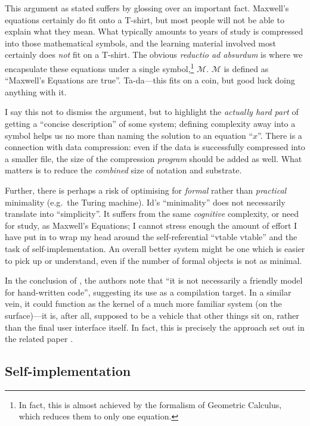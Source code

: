 This argument as stated suffers by glossing over an important fact.
Maxwell's equations certainly do fit onto a T-shirt, but most people
will not be able to explain what they mean. What typically amounts to
years of study is compressed into those mathematical symbols, and the
learning material involved most certainly does \emph{not} fit on a
T-shirt. The obvious \emph{reductio ad absurdum} is where we encapsulate
these equations under a single symbol,\footnote{In fact, this is almost
  achieved by the formalism of Geometric Calculus, which reduces them to
  only one equation.} \(\mathcal{M}\). \(\mathcal{M}\) is defined as
``Maxwell's Equations are true''. Ta-da---this fits on a coin, but good
luck doing anything with it.

I say this not to dismiss the argument, but to highlight the
\emph{actually hard part} of getting a ``concise description'' of some
system; defining complexity away into a symbol helps us no more than
naming the solution to an equation ``\(x\)''. There is a connection with
data compression: even if the data is successfully compressed into a
smaller file, the size of the compression \emph{program} should be added
as well. What matters is to reduce the \emph{combined} size of notation
and substrate.

Further, there is perhaps a risk of optimising for \emph{formal} rather
than \emph{practical} minimality (e.g.~the Turing machine). Id{}'s
``minimality'' does not necessarily translate into ``simplicity''. It
suffers from the same \emph{cognitive} complexity, or need for study, as
Maxwell's Equations; I cannot stress enough the amount of effort I have
put in to wrap my head around the self-referential ``vtable vtable'' and
the task of self-implementation. An overall better system might be one
which is easier to pick up or understand, even if the number of formal
objects is not as minimal.

In the conclusion of \cite{OROM}, the authors note that ``it is not
necessarily a friendly model for hand-written code'', suggesting its use
as a compilation target. In a similar vein, it could function as the
kernel of a much more familiar system (on the surface)---it is, after
all, supposed to be a vehicle that other things sit on, rather than the
final user interface itself. In fact, this is precisely the approach set
out in the related paper \cite{COLAs}.

\hypertarget{self-implementation}{%
\subsection{Self-implementation}\label{self-implementation}}

